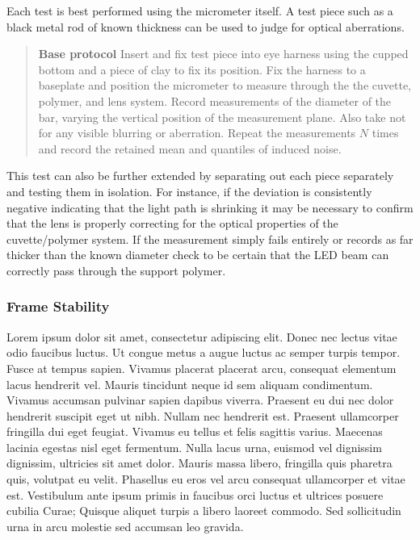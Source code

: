 \documentclass{article}
\begin{document}
Each test is best performed using the micrometer itself. A test piece such as a black metal rod of known thickness can be used to judge for optical aberrations.

\begin{quotation}
  \textbf{Base protocol} Insert and fix test piece into eye harness using the cupped bottom and a piece of clay to fix its position. Fix the harness to a baseplate and position the micrometer to measure through the the cuvette, polymer, and lens system. Record measurements of the diameter of the bar, varying the vertical position of the measurement plane. Also take not for any visible blurring or aberration. Repeat the measurements $N$ times and record the retained mean and quantiles of induced noise.
\end{quotation}

This test can also be further extended by separating out each piece separately and testing them in isolation. For instance, if the deviation is consistently negative indicating that the light path is shrinking it may be necessary to confirm that the lens is properly correcting for the optical properties of the cuvette/polymer system. If the measurement simply fails entirely or records as far thicker than the known diameter check to be certain that the LED beam can correctly pass through the support polymer.

\subsubsection{Frame Stability}
Lorem ipsum dolor sit amet, consectetur adipiscing elit. Donec nec lectus vitae odio faucibus luctus. Ut congue metus a augue luctus ac semper turpis tempor. Fusce at tempus sapien. Vivamus placerat placerat arcu, consequat elementum lacus hendrerit vel. Mauris tincidunt neque id sem aliquam condimentum. Vivamus accumsan pulvinar sapien dapibus viverra. Praesent eu dui nec dolor hendrerit suscipit eget ut nibh. Nullam nec hendrerit est. Praesent ullamcorper fringilla dui eget feugiat. Vivamus eu tellus et felis sagittis varius. Maecenas lacinia egestas nisl eget fermentum. Nulla lacus urna, euismod vel dignissim dignissim, ultricies sit amet dolor. Mauris massa libero, fringilla quis pharetra quis, volutpat eu velit. Phasellus eu eros vel arcu consequat ullamcorper et vitae est. Vestibulum ante ipsum primis in faucibus orci luctus et ultrices posuere cubilia Curae; Quisque aliquet turpis a libero laoreet commodo. Sed sollicitudin urna in arcu molestie sed accumsan leo gravida.
\end{document}
